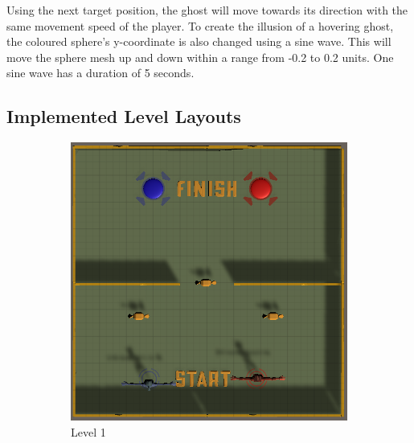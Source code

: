 Using the next target position, the ghost will move towards its direction with the same movement speed of the player. To create the illusion of a hovering ghost, the coloured sphere's y-coordinate is also changed using a sine wave. This will move the sphere mesh up and down within a range from -0.2 to 0.2 units. One sine wave has a duration of 5 seconds.



\newpage
\subsection{Implemented Level Layouts}
\label{section:level layouts}

\begin{figure}[h!]
    \centering
    \begin{subfigure}[b]{0.45\linewidth}
        \includegraphics[width=\linewidth]{images/level_1.png}
        \caption{Level 1}
        \label{fig:level 1}
      \end{subfigure}
    \begin{subfigure}[b]{0.45\linewidth}

\end{subfigure}
\end{figure}
